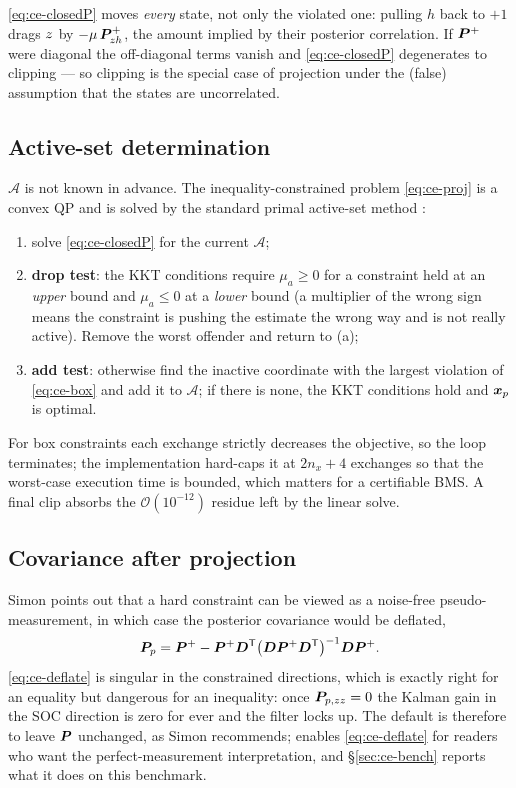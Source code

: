 \begin{remark}\label{rem:ce-notclip}
\eqref{eq:ce-closedP} moves \emph{every} state, not only the violated one: pulling $h$ back to
$+1$ drags $z$ by $-\mu\,\bm{P}^{+}_{z h}$, the amount implied by their posterior correlation.
If $\bm{P}^{+}$ were diagonal the off-diagonal terms vanish and \eqref{eq:ce-closedP} degenerates to
clipping --- so clipping is the special case of projection under the (false) assumption that the
states are uncorrelated.
\end{remark}

\subsection{Active-set determination}
$\mathcal{A}$ is not known in advance.  The inequality-constrained problem \eqref{eq:ce-proj} is a
convex QP and is solved by the standard primal active-set method \cite[Ch.~16]{nocedal2006}:

\begin{enumerate}[nosep,label=(\alph*)]
\item solve \eqref{eq:ce-closedP} for the current $\mathcal{A}$;
\item \textbf{drop test}: the KKT conditions require $\mu_a\ge0$ for a constraint held at an
\emph{upper} bound and $\mu_a\le0$ at a \emph{lower} bound (a multiplier of the wrong sign means
the constraint is pushing the estimate the wrong way and is not really active).  Remove the worst
offender and return to (a);
\item \textbf{add test}: otherwise find the inactive coordinate with the largest violation of
\eqref{eq:ce-box} and add it to $\mathcal{A}$; if there is none, the KKT conditions hold and
$\bm{x}_p$ is optimal.
\end{enumerate}
For box constraints each exchange strictly decreases the objective, so the loop terminates; the
implementation hard-caps it at $2n_x+4$ exchanges so that the worst-case execution time is
bounded, which matters for a certifiable BMS.  A final clip absorbs the $\mathcal{O}(10^{-12})$
residue left by the linear solve.

\subsection{Covariance after projection}
Simon \cite[\S2.1]{simon2010constraints} points out that a hard constraint can be viewed as a
noise-free pseudo-measurement, in which case the posterior covariance would be deflated,
\begin{equation}
\bm{P}_{p}=\bm{P}^{+}-\bm{P}^{+}\bm{D}^{\mathsf{T}}\big(\bm{D}\bm{P}^{+}\bm{D}^{\mathsf{T}}\big)^{-1}\bm{D}\bm{P}^{+} .
\label{eq:ce-deflate}
\end{equation}
\eqref{eq:ce-deflate} is singular in the constrained directions, which is exactly right for an
equality but dangerous for an inequality: once $\bm{P}_{p,zz}=0$ the Kalman gain in the SOC
direction is zero for ever and the filter locks up.  The default is therefore to leave $\bm{P}$
unchanged, as Simon recommends;  enables \eqref{eq:ce-deflate} for
readers who want the perfect-measurement interpretation, and \S\ref{sec:ce-bench} reports what it
does on this benchmark.

